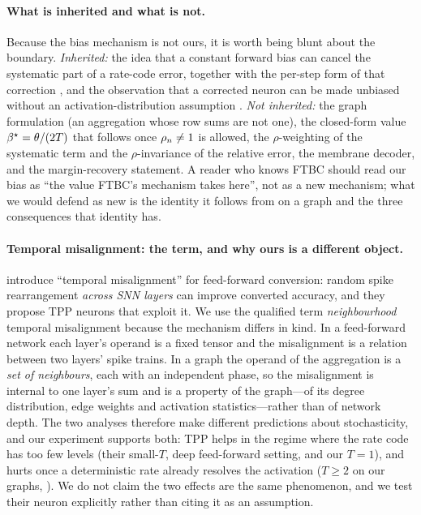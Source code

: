 \paragraph{What is inherited and what is not.}
Because the bias mechanism is not ours, it is worth being blunt about the boundary. \emph{Inherited:}
the idea that a constant forward bias can cancel the systematic part of a rate-code error, together
with the per-step form of that correction \citep{wu2024ftbc}, and the observation that a corrected
neuron can be made unbiased without an activation-distribution assumption \citep{bojkovic2025temporal}.
\emph{Not inherited:} the graph formulation (an aggregation whose row sums are not one), the
closed-form value $\beta^{\star} = \theta/(2T)$ that follows once $\rho_{n} \neq 1$ is allowed, the
$\rho$-weighting of the systematic term and the $\rho$-invariance of the relative error, the membrane
decoder, and the margin-recovery statement. A reader who knows FTBC should read our bias as ``the
value FTBC's mechanism takes here'', not as a new mechanism; what we would defend as new is the
identity it follows from on a graph and the three consequences that identity has.

\paragraph{Temporal misalignment: the term, and why ours is a different object.}
\citet{bojkovic2025temporal} introduce ``temporal misalignment'' for feed-forward conversion:
random spike rearrangement \emph{across SNN layers} can improve converted accuracy, and they propose
TPP neurons that exploit it. We use the qualified term \emph{neighbourhood} temporal misalignment
because the mechanism differs in kind. In a feed-forward network each layer's operand is a fixed
tensor and the misalignment is a relation between two layers' spike trains. In a graph the operand
of the aggregation is a \emph{set of neighbours}, each with an independent phase, so the misalignment
is internal to one layer's sum and is a property of the graph---of its degree distribution, edge
weights and activation statistics---rather than of network depth. The two analyses therefore make
different predictions about stochasticity, and our experiment supports both: TPP helps in the regime
where the rate code has too few levels (their small-$T$, deep feed-forward setting, and our $T=1$),
and hurts once a deterministic rate already resolves the activation ($T \ge 2$ on our graphs,
). We do not claim the two effects are the same phenomenon, and we test their
neuron explicitly rather than citing it as an assumption.

